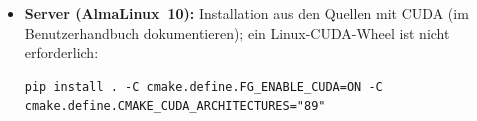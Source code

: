 \begin{itemize}[nosep]
        \verb|nvidia-cusolver-cu12| ab; die DLL-Verzeichnisse werden beim Import mit \verb|os.add_dll_directory| eingetragen.
        \verb|import fouriergrating| lädt den CUDA-Kern, wenn er installiert ist und eine GPU vorhanden ist, sonst den
        CPU-Kern (\verb|fg.core_variant()| meldet die Wahl). CI baut mit installiertem CUDA-Toolkit ($\ge12.6$ Update~2)
        ohne GPU; die Abnahme läuft auf dem Anwenderrechner. Keine CUDA-DLLs ins Wheel bündeln.
  \item \textbf{Server (AlmaLinux~10):} Installation aus den Quellen mit CUDA (im Benutzerhandbuch dokumentieren); ein
        Linux-CUDA-Wheel ist nicht erforderlich:
\begin{footnotesize}
\begin{verbatim}
pip install . -C cmake.define.FG_ENABLE_CUDA=ON -C cmake.define.CMAKE_CUDA_ARCHITECTURES="89"
\end{verbatim}
\end{footnotesize}
\end{itemize}

